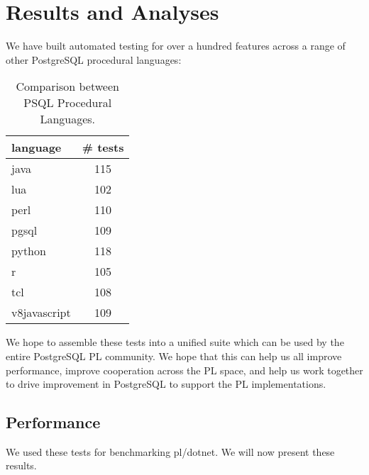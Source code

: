 \documentclass[sigconf,techreport,authorversion,nonacm]{acmart}
\begin{document}

\section{Results and Analyses}

We have built automated testing for over a hundred features across
a range of other PostgreSQL procedural languages:

\begin{table}[!htbp]
       \caption{Comparison between PSQL Procedural Languages.}
       \begin{tabular}{l | c }
               \toprule
               \rowcolor{gray!25} \textbf{language} & \textbf{\# tests} \\ \midrule
               java                                 & 115               \\
               lua                                  & 102               \\
               perl                                 & 110               \\
               pgsql                                & 109               \\
               python                               & 118               \\
               r                                    & 105               \\
               tcl                                  & 108               \\
               v8javascript                         & 109               \\ \bottomrule
       \end{tabular}
\end{table}

We hope to assemble these tests into a unified suite which can be
used by the entire PostgreSQL PL community. We hope that this can
help us all improve performance, improve cooperation across the PL
space, and help us work together to drive improvement in PostgreSQL
to support the PL implementations.

\subsection{Performance}

We used these tests for benchmarking pl/dotnet. We will now present
these results.
\end{document}
